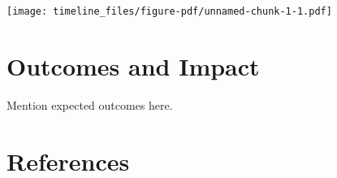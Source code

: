 \documentclass[
  a4paper,
]{scrreprt}
\begin{document}
\texttt{[image: timeline\_files/figure-pdf/unnamed-chunk-1-1.pdf]}

\hypertarget{outcomes-and-impact}{%
\chapter{Outcomes and Impact}\label{outcomes-and-impact}}

Mention expected outcomes here.


\hypertarget{references}{%
\chapter*{References}\label{references}}


\begingroup
\raggedright
\end{document}
